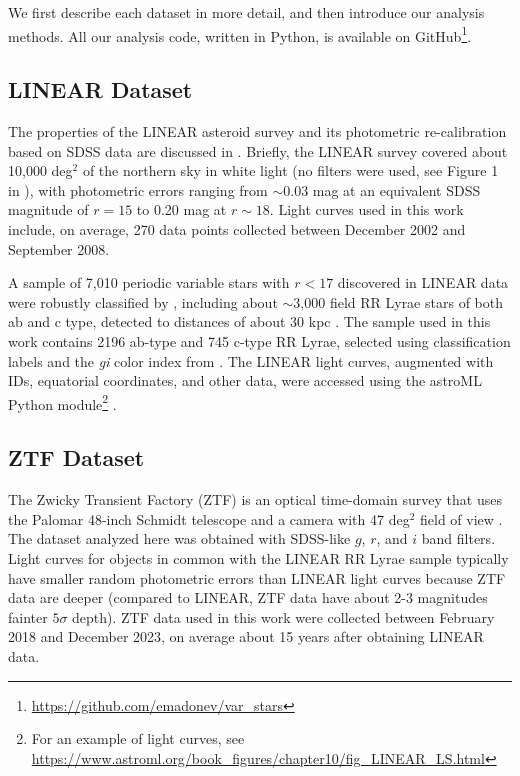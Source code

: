 We first describe each dataset in more detail, and then introduce our analysis methods. All our analysis
code, written in Python, is available on GitHub\footnote{\url{https://github.com/emadonev/var_stars}}.  
 
\subsection{LINEAR Dataset}

The properties of the LINEAR asteroid survey and its photometric re-calibration based on SDSS data are discussed
in \cite{2011AJ....142..190S}. Briefly, the LINEAR survey covered about 10,000 deg$^2$ of the northern sky in white
light (no filters were used, see Figure 1 in \citealt{2011AJ....142..190S}), with photometric errors ranging from $\sim$0.03
mag at an equivalent SDSS magnitude of $r=15$ to 0.20 mag at $r\sim18$. Light curves used in this work include,
on average, 270 data points collected between December 2002 and September 2008.
 
A sample of 7,010 periodic variable stars with $r<17$ discovered in LINEAR data were robustly classified by
\cite{2013AJ....146..101P}, including
about $\sim$3,000 field RR Lyrae stars of both ab and c type, detected to distances of about 30 kpc \citep{2013AJ....146...21S}.
The sample used in this work contains 2196 ab-type and 745 c-type RR Lyrae, selected using classification labels and the {\it gi}
color index from \cite{2013AJ....146..101P}.
The LINEAR light curves, augmented with IDs, equatorial coordinates, and other data, were accessed using the astroML Python
module\footnote{For an example of light curves, see \url{https://www.astroml.org/book_figures/chapter10/fig_LINEAR_LS.html}}
\citep{2012cidu.conf...47V}. 


\subsection{ZTF Dataset}

The Zwicky Transient Factory (ZTF) is an optical time-domain survey that uses the Palomar 48-inch Schmidt telescope
and a camera with 47 deg$^2$ field of view \citep{2019PASP..131a8002B}. The dataset analyzed here was obtained with
SDSS-like $g$, $r$, and $i$ band filters. Light curves for objects in common with the LINEAR RR Lyrae sample typically
have smaller random photometric errors than LINEAR light curves because ZTF data are deeper (compared to LINEAR,
ZTF data have about 2-3 magnitudes fainter  $5\sigma$ depth). ZTF data used in this work were collected between
February 2018 and December 2023, on average about 15 years after obtaining LINEAR data. 

